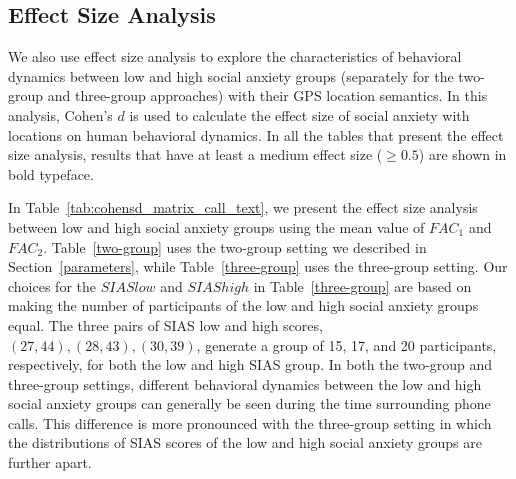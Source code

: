 \subsection{Effect Size Analysis}
% 
% 
We also use effect size analysis to explore the characteristics of behavioral dynamics between low and high social anxiety groups (separately for the two-group and three-group approaches) with their GPS location semantics. In this analysis, Cohen's $d$ is used to calculate the effect size of social anxiety with locations on human behavioral dynamics. In all the tables that present the effect size analysis, results that have at least a medium effect size ($\geq 0.5$) are shown in bold typeface.

In Table~\ref{tab:cohensd_matrix_call_text}, we present the effect size analysis between low and high social anxiety groups using the mean value of $FAC_1$ and $FAC_2$. Table~\ref{two-group} uses the two-group setting we described in Section~\ref{parameters}, while Table~\ref{three-group} uses the three-group setting. Our choices for the $SIAS low$ and $SIAS high$ in  Table~\ref{three-group} are based on making the number of participants of the low and high social anxiety groups equal. The three pairs of SIAS low and high scores, $(27,44), (28,43), (30,39)$, generate a group of 15, 17, and 20 participants, respectively, for both the low and high SIAS group. In both the two-group and three-group settings, different behavioral dynamics between the low and high social anxiety groups can generally be seen during the time surrounding phone calls. This difference is more pronounced with the three-group setting in which the distributions of SIAS scores of the low and high social anxiety groups are further apart. 
% 
% 
% 


